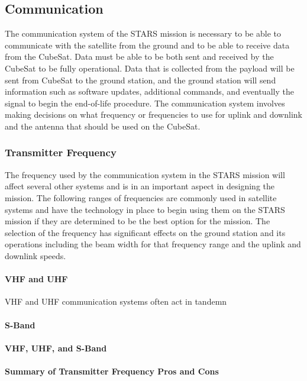 \subsection{Communication}
The communication system of the STARS mission is necessary to be able to communicate with the satellite from the ground and to be able to receive data from the CubeSat. Data must be able to be both sent and received by the CubeSat to be fully operational. Data that is collected from the payload will be sent from CubeSat to the ground station, and the ground station will send information such as software updates, additional commands, and eventually the signal to begin the end-of-life procedure. The communication system involves making decisions on what frequency or frequencies to use for uplink and downlink and the antenna that should be used on the CubeSat. 

\subsubsection{Transmitter Frequency}
The frequency used by the communication system in the STARS mission will affect several other systems and is in an important aspect in designing the mission. The following ranges of frequencies are commonly used in satellite systems and have the technology in place to begin using them on the STARS mission if they are determined to be the best option for the mission. The selection of the frequency has significant effects on the ground station and its operations including the beam width for that frequency range and the uplink and downlink speeds. 

\paragraph{VHF and UHF}
VHF and UHF communication systems often act in tandemn 

\paragraph{S-Band}
\paragraph{VHF, UHF, and S-Band}
\paragraph{Summary of Transmitter Frequency Pros and Cons}

